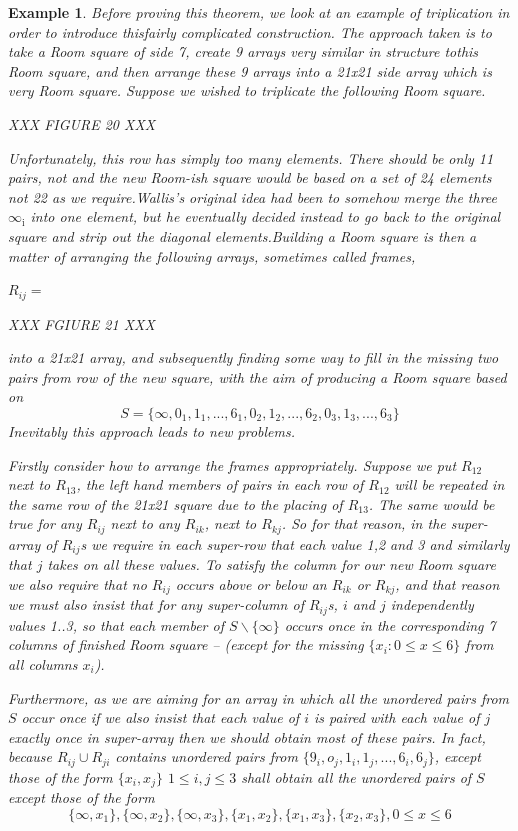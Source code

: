 \documentclass[
  11pt,
  a4paper]{book}
\newtheorem{example}{Example}
\begin{document}
\begin{example}
Before proving this theorem, we look at an example of
triplication in order to introduce thisfairly complicated
construction.  The approach taken is to take a Room square
of side 7, create 9 arrays very similar in structure tothis
Room square, and then arrange these 9 arrays into a 21x21
side array which is very Room square.  Suppose we wished to
triplicate the following Room square.

XXX FIGURE 20 XXX

Unfortunately, this row has simply too many elements. There
should be only 11 pairs, not and the new Room-ish square
would be based on a set of 24 elements not 22 as we
require.Wallis’s original idea had been to somehow merge the
three $\infty _\mathrm{i}$ into one element, but he
eventually decided instead to go back to the original square
and strip out the diagonal elements.Building a Room square
is then a matter of arranging the following arrays,
sometimes called frames,

$R_{ij} = $

XXX FGIURE 21 XXX

into a 21x21 array, and subsequently finding some way to
fill in the missing two pairs from row of the new square,
with the aim of producing a Room square based on
$$S = \{\infty,0_1,1_1,...,6_1,0_2,1_2,...,6_2,0_3,1_3,...,6_3\}$$
Inevitably this approach leads to new problems.

Firstly consider how to arrange the frames appropriately.
Suppose we put $R_{12}$ next to $R_{13}$, the left hand
members of pairs in each row of $R_{12}$ will be repeated in
the same row of the 21x21 square due to the placing of
$R_{13}$. The same would be true for any $R_{ij}$ next to
any $R_{ik}$, next to $R_{kj}$. So for that reason, in the
super-array of $R_{ij}$s we require in each super-row that
each value 1,2 and 3 and similarly that $j$ takes on all
these values.  To satisfy the column for our new Room square
we also require that no $R_{ij}$ occurs above or below an
$R_{ik}$ or $R_{kj}$, and that reason we must also insist
that for any super-column of $R_{ij}$s, $i$ and $j$
independently values 1..3, so that each member of
$S \backslash \{\infty\}$ occurs once in the corresponding 7
columns of finished Room square – (except for the missing
$\{x_i: 0 \leq x \leq 6\}$ from all columns $x_i$).

Furthermore, as we are aiming for an array in which all the
unordered pairs from $S$ occur once if we also insist that
each value of $i$ is paired with each value of $j$ exactly
once in super-array then we should obtain most of these
pairs. In fact, because $R_{ij} \cup R_{ji}$ contains
unordered pairs from $\{9_i,o_j,1_i,1_j,...,6_i,6_j\}$,
except those of the form $\{x_i,x_j\}$ $1 \leq i,j \leq 3$
shall obtain all the unordered pairs of $S$ except those of
the form
$$\{\infty,x_1\},\{\infty,x_2\},\{\infty,x_3\},\{x_1,x_2\},\{x_1,x_3\},\{x_2,x_3\}, 0 \leq x \leq 6$$


\end{example}
\end{document}
